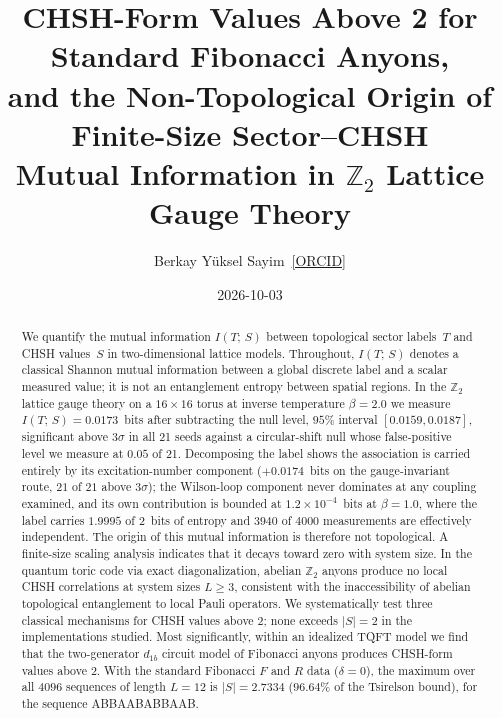 \documentclass[aps,pra,twocolumn,superscriptaddress,showpacs,floatfix]{revtex4-2}
\newcommand{\Ztwo}{\mathbb{Z}_2}
\newcommand{\MI}{I(T;\,S)}
\begin{document}
\setcounter{secnumdepth}{3}

\title{CHSH-Form Values Above 2 for Standard Fibonacci Anyons,\\
and the Non-Topological Origin of Finite-Size Sector--CHSH\\
Mutual Information in $\Ztwo$ Lattice Gauge Theory}

\author{Berkay Y\"uksel Sayim\,%
  \href{https://orcid.org/0009-0004-4993-7352}{[ORCID]}}

\date{2026-10-03}

\begin{abstract}
We quantify the mutual information $\MI$ between topological sector labels~$T$
and CHSH values~$S$ in two-dimensional lattice models. Throughout, $\MI$ denotes
a classical Shannon mutual information between a global discrete label and a
scalar measured value; it is not an entanglement entropy between spatial
regions. In the $\Ztwo$ lattice gauge theory on a $16\times 16$ torus at inverse
temperature $\beta = 2.0$ we measure $\MI = 0.0173$~bits after subtracting the
null level, $95\%$ interval $[0.0159, 0.0187]$, significant above $3\sigma$ in
all 21 seeds against a circular-shift null whose false-positive level we measure
at $0.05$ of 21. Decomposing the label shows the association is carried entirely
by its excitation-number component ($+0.0174$~bits on the gauge-invariant
route, $21$ of $21$ above
$3\sigma$); the Wilson-loop component never dominates at any coupling examined,
and its own contribution is bounded at $1.2\times10^{-4}$~bits at
$\beta = 1.0$, where the label carries $1.9995$ of $2$~bits of entropy and
$3940$ of $4000$ measurements are effectively independent. The origin of this
mutual information is therefore not topological. A finite-size scaling
analysis indicates that it decays toward zero with system size. In the quantum toric code via exact
diagonalization, abelian $\Ztwo$ anyons produce no local CHSH
correlations at system sizes $L \geq 3$, consistent with the inaccessibility
of abelian topological entanglement to local Pauli operators. We
systematically test three classical mechanisms for CHSH values above 2; none
exceeds $|S| = 2$ in the implementations studied.
Most significantly, within an idealized TQFT model we find that the
two-generator $d_{1b}$ circuit model of Fibonacci anyons produces CHSH-form
values above 2. With the standard Fibonacci $F$ and $R$ data ($\delta = 0$),
the maximum over all $4096$ sequences of length $L = 12$ is $|S| =
2.7334$ ($96.64\%$ of the Tsirelson bound), for the sequence ABBAABABBAAB.

\end{abstract}
\end{document}
